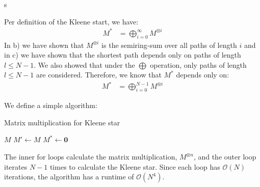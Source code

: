 \documentclass[a4paper,12pt]{ETHexercise}
\begin{document}
\begin{question}
\begin{subquestion}
	\end{subquestion}
	\begin{subquestion}
		s
	\end{subquestion}
	\begin{subquestion}
		Per definition of the Kleene start, we have:
		\begin{align}
			M^* & = \bigoplus_{i=0}^{\infty} M^{\otimes i}
		\end{align}
		In b) we have shown that $M^{\otimes i}$ is the semiring-sum over all paths of length $i$ and in c) we have shown that the shortest path depends only on paths of length $l \leq N-1$. We also showed that under the $\bigoplus$ operation, only paths of length $l \leq N-1$ are considered. Therefore, we know that $M^*$ depends only on:
		\begin{align}
			M^{*} & = \bigoplus_{i=0}^{N-1} M^{\otimes i}
		\end{align}
	\end{subquestion}
	\begin{subquestion}
		We define a simple algorithm:\\
		\begin{algorithm}[H]
			\label{M_star}
			\caption{Matrix multiplication for Kleene star}
			$M$\;
			$M' \gets M$
			$M^* \gets \mathbf{0}$\;
		\end{algorithm}
		The inner for loops calculate the matrix multiplication, $M^{\otimes n}$, and the outer loop iterates $N-1$ times to calculate the Kleene star. Since each loop has $\mathcal{O}(N)$ iterations, the algorithm has a runtime of $\mathcal{O}(N^4)$.\\
	\end{subquestion}
\end{question}
\end{document}
